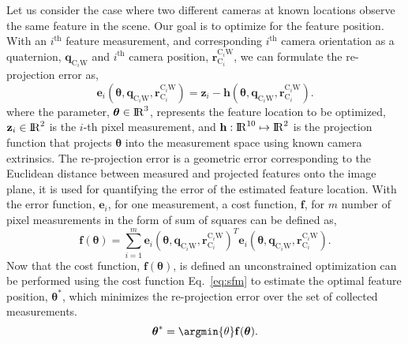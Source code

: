 \documentclass{report}
\renewcommand{\Vec}[1]{{\mathbf{#1}}}
\newcommand{\real}{{\rm I\!R}}
\newcommand{\quat}{{\Vec{q}}}
\newcommand{\cam}{{\text{C}}}
\newcommand{\world}{{\text{W}}}
\newcommand{\pos}{{\Vec{r}}}
\newcommand{\measurement}{{\Vec{z}}}
\begin{document}
Let us consider the case where two different cameras at known locations observe
the same feature in the scene. Our goal is to optimize for the feature
position. With an $i^{\text{th}}$ feature measurement, and corresponding
$i^{\text{th}}$ camera orientation as a quaternion, $\quat_{\cam_{i}\world}$ and
$i^{\text{th}}$ camera position, $\pos_{\cam_{i}}^{\cam_{i}\world}$, we can
formulate the re-projection error as,
%
\begin{equation}
	\label{eq:bundle_adjustment_residual}
	\mathbf{e}_{i}(\boldsymbol{\theta},
								 \quat_{\cam_{i}\world},
								 \pos_{\cam_{i}}^{\cam_{i}\world})
	=
	\measurement_{i}
	- \mathbf{h}(\boldsymbol{\theta},
							 \quat_{\cam_{i}\world},
							 \pos_{\cam_{i}}^{\cam_{i}\world}).
\end{equation}
%
where the parameter, $\boldsymbol{\theta} \in \real^{3}$, represents the
feature location to be optimized, $\measurement_{i} \in \real^{2}$ is the
$i$-th pixel measurement, and $\mathbf{h} : \real^{10} \mapsto \real^{2}$ is
the projection function that projects $\boldsymbol{\theta}$ into the
measurement space using known camera extrinsics. The re-projection error is a
geometric error corresponding to the Euclidean distance between measured and
projected features onto the image plane, it is used for quantifying the error
of the estimated feature location. With the error function, $\Vec{e}_{i}$,
for one measurement, a cost function, $\Vec{f}$, for $m$ number of pixel
measurements in the form of sum of squares can be defined as,
%
\begin{equation}
  \label{eq:sfm}
  \mathbf{f}(\boldsymbol{\theta})
	= \sum^{m}_{i=1}
    \mathbf{e}_{i}(
	    \boldsymbol{\theta},
	    \quat_{\cam_{i}\world},
	    \pos_{\cam_{i}}^{\cam_{i}\world}
	)^{T}
	\mathbf{e}_{i}(
		\boldsymbol{\theta},
		\quat_{\cam_{i}\world},
		\pos_{\cam_{i}}^{\cam_{i}\world}
	).
\end{equation}
%
Now that the cost function, $\mathbf{f}(\boldsymbol{\theta})$, is defined an
unconstrained optimization can be performed using the cost function
Eq.~\ref{eq:sfm} to estimate the optimal feature position,
$\boldsymbol{\theta}^{*}$, which minimizes the re-projection error over the set
of collected measurements.
%
\begin{equation}
	\boldsymbol{\theta}^{*} = \argmin{\theta} \mathbf{f}(\boldsymbol{\theta}).
\end{equation}
%
\end{document}
